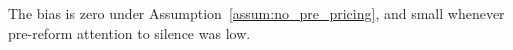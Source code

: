 The bias is zero under Assumption~\ref{assum:no_pre_pricing}, and small whenever pre-reform attention to silence was low.
